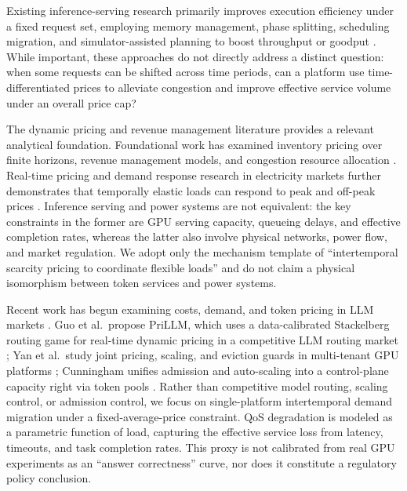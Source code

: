 \documentclass[11pt]{article}
\begin{document}
Existing inference-serving research primarily improves execution efficiency
under a fixed request set, employing memory management, phase splitting,
scheduling migration, and simulator-assisted planning to boost throughput or
goodput
\cite{patel2024splitwise,zhong2024distserve,agrawal2024vidur}.
While important, these approaches do not directly address a distinct question:
when some requests can be shifted across time periods, can a platform use
time-differentiated prices to alleviate congestion and improve effective
service volume under an overall price cap?

The dynamic pricing and revenue management literature provides a relevant
analytical foundation. Foundational work has examined inventory pricing over
finite horizons, revenue management models, and congestion resource allocation
\cite{vickrey1969congestion,gallego1994dynamic,elmaghraby2003dynamic,
bitran2003overview,talluri2004revenue,phillips2005pricing}.
Real-time pricing and demand response research in electricity markets further
demonstrates that temporally elastic loads can respond to peak and off-peak
prices \cite{schweppe1988spot,borenstein2005long,albadi2008summary,
faruqui2010household,allcott2011rethinking,siano2014demand}.
Inference serving and power systems are not equivalent: the key constraints in
the former are GPU serving capacity, queueing delays, and effective completion
rates, whereas the latter also involve physical networks, power flow, and
market regulation. We adopt only the mechanism template of
``intertemporal scarcity pricing to coordinate flexible loads'' and do not
claim a physical isomorphism between token services and power systems.

Recent work has begun examining costs, demand, and token pricing in LLM
markets
\cite{demirer2025emerging,erdil2025inference,bergemann2025menu,
xing2026tokenfutures}.
Guo et al.\ propose PriLLM, which uses a data-calibrated Stackelberg routing
game for real-time dynamic pricing in a competitive LLM routing market
\cite{guo2026prillm};
Yan et al.\ study joint pricing, scaling, and eviction guards in multi-tenant
GPU platforms \cite{yan2026stackelberg};
Cunningham unifies admission and auto-scaling into a control-plane capacity
right via token pools \cite{cunningham2026token}.
Rather than competitive model routing, scaling control, or admission control,
we focus on single-platform intertemporal demand migration under a
fixed-average-price constraint. QoS degradation is modeled as a parametric
function of load, capturing the effective service loss from latency, timeouts,
and task completion rates. This proxy is not calibrated from real GPU
experiments as an ``answer correctness'' curve, nor does it constitute a
regulatory policy conclusion.
\end{document}
